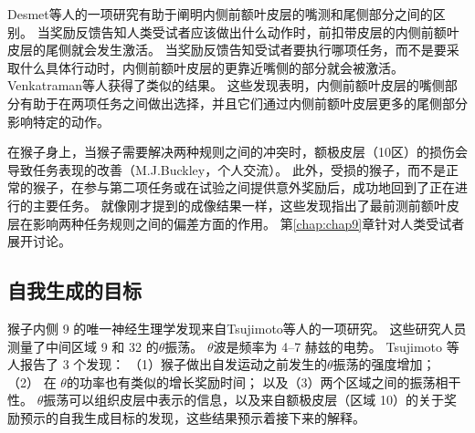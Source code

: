 Desmet等人\cite{desmet2011errors}的一项研究有助于阐明内侧前额叶皮层的嘴测和尾侧部分之间的区别。
当奖励反馈告知人类受试者应该做出什么动作时，前扣带皮层的内侧前额叶皮层的尾侧就会发生激活。
当奖励反馈告知受试者要执行哪项任务，而不是要采取什么具体行动时，内侧前额叶皮层的更靠近嘴侧的部分就会被激活。
Venkatraman等人\cite{venkatraman2009resolving}获得了类似的结果。
这些发现表明，内侧前额叶皮层的嘴侧部分有助于在两项任务之间做出选择，并且它们通过内侧前额叶皮层更多的尾侧部分影响特定的动作。\par


在猴子身上，当猴子需要解决两种规则之间的冲突时，额极皮层（10区）的损伤会导致任务表现的改善（M.J.Buckley，个人交流）。
此外，受损的猴子，而不是正常的猴子，在参与第二项任务或在试验之间提供意外奖励后，成功地回到了正在进行的主要任务。
就像刚才提到的成像结果一样，这些发现指出了最前测前额叶皮层在影响两种任务规则之间的偏差方面的作用。
第\ref{chap:chap9}章针对人类受试者展开讨论。\par



\subsection{自我生成的目标}

猴子内侧 9 的唯一神经生理学发现来自Tsujimoto等人\cite{tsujimoto2006direct}的一项研究。
这些研究人员测量了中间区域 9 和 32 的$\theta$振荡。
$ \theta $波是频率为 4–7 赫兹的电势。
Tsujimoto 等人报告了 3 个发现：
（1）猴子做出自发运动之前发生的$ \theta $振荡的强度增加；
（2） 在 $\theta$的功率也有类似的增长奖励时间；
以及（3）两个区域之间的振荡相干性。
$ \theta $振荡可以组织皮层中表示的信息，以及来自额极皮层（区域 10）的关于奖励预示的自我生成目标的发现，这些结果预示着接下来的解释。\par


